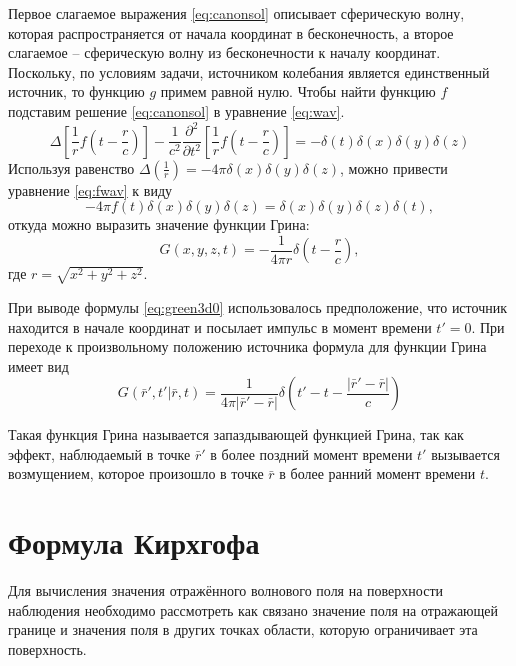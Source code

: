 \documentclass[a4paper, fontsize=14pt]{article}
\begin{document}
Первое слагаемое выражения \ref{eq:canonsol} описывает сферическую волну, которая распространяется от начала координат в бесконечность, а второе слагаемое -- сферическую волну из бесконечности к началу координат. Поскольку, по условиям задачи, источником колебания является единственный источник, то функцию $g$ примем равной нулю.  Чтобы найти функцию  $f$  подставим решение \ref{eq:canonsol} в уравнение \ref{eq:wav}. 
\begin{equation}
	\Delta \left[ \frac{1}{r}f\left(t-\frac{r}{c}\right) \right] - \frac{1}{c^2} \frac{\partial^2 }{\partial
		t^2}\left[ \frac{1}{r}f\left(t-\frac{r}{c}\right) \right]  = - \delta(t)\delta(x)\delta(y)\delta(z)
		\label{eq:fwav}
\end{equation}
Используя равенство $\Delta\left(\frac{1}{r}\right) = -4\pi \delta(x)\delta(y)\delta(z)$, можно привести уравнение \ref{eq:fwav}
к виду 
\begin{equation}
	-4\pi f(t) \delta(x) \delta(y) \delta(z)  = \delta(x) \delta(y) \delta(z) \delta(t),
\label{eq:fdel}	
\end{equation}
откуда можно выразить значение функции Грина:
\begin{equation}
	G(x,y,z,t) = -\frac{1}{4\pi r} \delta \left(t - \frac{r}{c}\right),
\label{eq:green3d0}	
\end{equation}  
где $r = \sqrt{x^2+y^2+z^2}$.

При выводе формулы \ref{eq:green3d0} использовалось предположение,  что источник находится в начале координат  и посылает импульс в момент времени $t' = 0$. При переходе к произвольному положению источника 
формула для функции Грина имеет вид
\begin{equation}
	G(\bar{r}',t'|\bar{r},t)= \frac{1}{4\pi|\bar{r}'-\bar{r}|}
	\delta\left(t'-t-\frac{|\bar{r}'-\bar{r}|}{c}\right)
\label{eq:green3d}
\end{equation}

	Такая функция Грина называется запаздывающей функцией Грина, так как эффект,
	наблюдаемый в точке $\bar{r}'$ в более поздний момент времени $t'$ вызывается
	возмущением,
	которое произошло в точке $\bar{r}$ в более ранний момент времени $t$.

	


	
	\section{Формула Кирхгофа}
	Для вычисления значения отражённого волнового поля на поверхности наблюдения необходимо 
	рассмотреть как связано значение поля на отражающей границе и значения поля в других точках области, которую ограничивает эта поверхность.   
	
\end{document}
